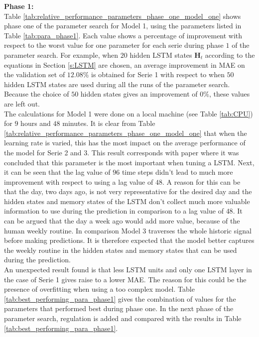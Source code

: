 \textbf{Phase 1:}\\
Table \ref{tab:relative_performance_parameters_phase_one_model_one} shows phase one of the parameter search for Model 1, using the parameters listed in Table \ref{tab:para_phase1}. Each value shows a percentage of improvement with respect to the worst value for one parameter for each serie during phase $ 1 $ of the parameter search. For example, when $ 20 $ hidden LSTM states $ \bm{H}_t $ according to the equations in Section \ref{s:LSTM} are chosen, an average improvement in MAE on the validation set of $ 12.08\% $ is obtained for Serie 1 with respect to when $ 50 $ hidden LSTM states are used during all the runs of the parameter search. Because the choice of $ 50 $ hidden states gives an improvement of $ 0\% $, these values are left out.\\
The calculations for Model 1 were done on a local machine (see Table \ref{tab:CPU}) for $ 9 $ hours and $ 48 $ minutes. It is clear from Table \ref{tab:relative_performance_parameters_phase_one_model_one} that when the learning rate is varied, this has the most impact on the average performance of the model for Serie 2 and 3. This result corresponds with paper \cite{Greff2017} where it was concluded that this parameter is the most important when tuning a LSTM. Next, it can be seen that the lag value of $ 96 $ time steps didn't lead to much more improvement with respect to using a lag value of $ 48 $. A reason for this can be that the day, two days ago, is not very representative for the desired day and the hidden states and memory states of the LSTM don't collect much more valuable information to use during the prediction in comparison to a lag value of $ 48 $. It can be argued that the day a week ago would add more value, because of the human weekly routine. In comparison Model $ 3 $ traverses the whole historic signal before making predictions. It is therefore expected that the model better captures the weekly routine in the hidden states and memory states that can be used during the prediction.\\
An unexpected result found is that less LSTM units and only one LSTM layer in the case of Serie 1 gives raise to a lower MAE. The reason for this could be the presence of overfitting when using a too complex model. Table \ref{tab:best_performing_para_phase1} gives the combination of values for the parameters that performed best during phase one. In the next phase of the parameter search, regulation is added and compared with the results in Table \ref{tab:best_performing_para_phase1}.\\

